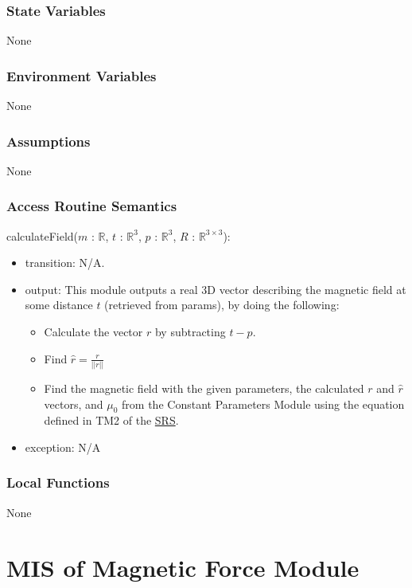 \documentclass[12pt, titlepage]{article}
\begin{document}
\subsubsection{State Variables}
None

\subsubsection{Environment Variables}
None

\subsubsection{Assumptions}
None 

\subsubsection{Access Routine Semantics}

\noindent calculateField($m$ : $\mathbb{R}$, $t$ : $\mathbb{R}^3$, $p$ : $\mathbb{R}^3$, $R$ : $\mathbb{R}^{3 \times 3}$):
\begin{itemize}
\item transition: N/A.
\item output: This module outputs a real 3D vector describing the magnetic field at some distance $t$ (retrieved from params), by doing the following:
\begin{itemize}
  \item Calculate the vector $r$ by subtracting $t - p$. 
  \item Find $\hat{r} = \frac{r}{|| r ||}$ 
  \item Find the magnetic field with the given parameters, the calculated $r$ and $\hat{r}$ vectors, and $\mu_0$ from the Constant Parameters Module using the equation defined in TM2 of the \href{https://github.com/husseinsd1/optimal-em-arrangement/blob/main/docs/SRS/SRS.pdf}{SRS}. 
\end{itemize}
\item exception: N/A
\end{itemize}

\subsubsection{Local Functions}
None

\newpage

\section{MIS of Magnetic Force Module} \label{MISMagForce}
\end{document}
